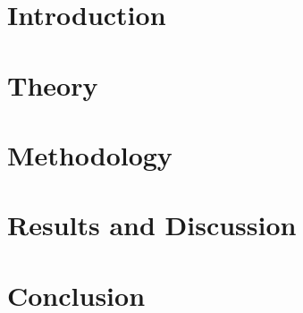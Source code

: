 \documentclass[%
a4paper,							
11pt,								
bibliography=totoc,						
abstracton=true					
]
{scrartcl}
\theoremstyle{plain}
\theoremstyle{definition}
\theoremstyle{remark}
\newcommand{\1}{\mathbbm{1}}
\begin{document}

\section{Introduction}\label{sec:Introduction}



\section{Theory}\label{sec:theory}




\section{Methodology}\label{sec:Method}



\section{Results and Discussion}\label{sec:Results}



\section{Conclusion}\label{sec:Conclusion}


\newpage
\appendix
\end{document}
